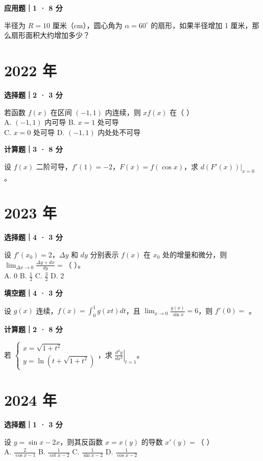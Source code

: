 \textbf{应用题｜1 · 8 分}

半径为 $R = 10$ 厘米（cm），圆心角为 $\alpha = 60^\circ$ 的扇形，如果半径增加 1 厘米，那么扇形面积大约增加多少？


\section*{2022 年}


\textbf{选择题｜2 · 3 分}

若函数 $f(x)$ 在区间 $(-1, 1)$ 内连续，则 $xf(x)$ 在（ \quad ）\\
A. $(-1, 1)$ 内可导 \quad B. $x = 1$ 处可导\\
C. $x = 0$ 处可导 \quad D. $(-1, 1)$ 内处处不可导


\textbf{计算题｜3 · 8 分}

设 $f(x)$ 二阶可导，$f'(1) = -2$，$F(x) = f(\cos x)$，求 $\left. d(F'(x)) \right|_{x=0}$。


\section*{2023 年}


\textbf{选择题｜4 · 3 分}

设 $f'(x_0) = 2$，$\Delta y$ 和 $dy$ 分别表示 $f(x)$ 在 $x_0$ 处的增量和微分，则 $\lim_{\Delta x \to 0} \frac{\Delta y + dx}{dy} =$（ \quad ）。\\
A. 0 \quad B. $\frac{1}{2}$ \quad C. $\frac{3}{2}$ \quad D. 2


\textbf{填空题｜4 · 3 分}

设 $g(x)$ 连续，$f(x) = \int_0^1 g(xt) dt$，且 $\lim_{x \to 0} \frac{g(x)}{\sin x} = 6$，则 $f'(0) = $ \underline{\hspace{3cm}}。


\textbf{计算题｜2 · 8 分}

若 $\begin{cases} x = \sqrt{1+t^2} \\ y = \ln(t + \sqrt{1+t^2}) \end{cases}$，求 $\left. \frac{d^2y}{dx^2} \right|_{t=1}$。


\section*{2024 年}


\textbf{选择题｜1 · 3 分}

设 $y = \sin x - 2x$，则其反函数 $x = x(y)$ 的导数 $x'(y) =$（ \quad ）\\
A. $\frac{2}{\cos x - 1}$ \quad B. $\frac{1}{\cot x - 2}$ \quad C. $\frac{1}{\sin x - 2}$ \quad D. $\frac{1}{\cos x - 2}$


